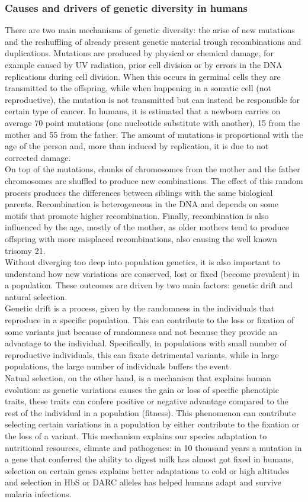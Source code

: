 \subsubsection{Causes and drivers of genetic diversity in humans}
There are two main mechanisms of genetic diversity: the arise of new mutations and the reshuffling of already present genetic material trough recombinations and duplications. Mutations are produced by physical or chemical damage, for example caused by UV radiation, prior cell division or by errors in the DNA replications during cell division. When this occurs in germinal cells they are transmitted to the offspring, while when happening in a somatic cell (not reproductive), the mutation is not transmitted but can instead be responsible for certain type of cancer. In humans, it is estimated that a newborn carries on average 70 point mutations (one nucleotide substitute with another), 15 from the mother and 55 from the father. The amount of mutations is proportional with the age of the person and, more than induced by replication, it is due to not corrected damage.\\
On top of the mutations, chunks of chromosomes from the mother and the father chromosomes are shuffled to produce new combinations. The effect of this random process produces the differences between siblings with the same biological parents. Recombination is heterogeneous in the DNA and depends on some motifs that promote higher recombination. Finally, recombination is also influenced by the age, mostly of the mother, as older mothers tend to produce offspring with more misplaced recombinations, also causing the well known trisomy 21.\\
Without diverging too deep into population genetics, it is also important to understand how new variations are conserved, lost or fixed (become prevalent) in a population. These outcomes are driven by two main factors: genetic drift and natural selection.\\
Genetic drift is a process, given by the randomness in the individuals that reproduce in a specific population. This can contribute to the loss or fixation of some variants just because of randomness and not because they provide an advantage to the individual. Specifically, in populations with small number of reproductive individuals, this can fixate detrimental variants, while in large populations, the large number of individuals buffers the event. \\
Natual selection, on the other hand, is a mechanism that explains human evolution: as genetic variations causes the gain or loss of specific phenotipic traits, these traits can confere positive or negative advantage compared to the rest of the individual in a population (fitness). This phenomenon can contribute selecting certain variations in a population by either contribute to the fixation or the loss of a variant. This mechanism explains our species adaptation to nutritional resources, climate and pathogenes: in 10 thousand years a mutation in a gene that conferred the ability to digest milk has almost got fixed in humans, selection on certain genes explains better adaptations to cold or high altitudes and selection in HbS or DARC alleles has helped humans adapt and survive malaria infections\cite{genome_diversity_quintana}. 
